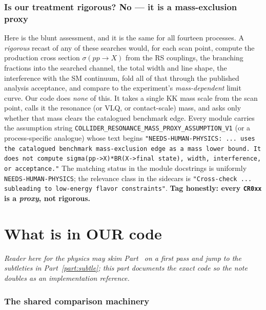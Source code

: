 \documentclass[11pt]{article}
\newcommand{\code}[1]{\texttt{#1}}
\theoremstyle{definition}
\begin{document}
\section{Is our treatment rigorous? No --- it is a mass-exclusion proxy}
\label{sec:proxy}

Here is the blunt assessment, and it is the same for all fourteen processes. A
\emph{rigorous} recast of any of these searches would, for each scan point,
compute the production cross section $\sigma(pp\to X)$ from the RS couplings, the
branching fractions into the searched channel, the total width and line shape,
the interference with the SM continuum, fold all of that through the published
analysis acceptance, and compare to the experiment's \emph{mass-dependent} limit
curve. Our code does \emph{none} of this. It takes a single KK mass scale from
the scan point, calls it the resonance (or VLQ, or contact-scale) mass, and asks
only whether that mass clears the catalogued benchmark edge. Every module carries
the assumption string \code{COLLIDER\_RESONANCE\_MASS\_PROXY\_ASSUMPTION\_V1}
(or a process-specific analogue) whose text begins
\code{"NEEDS-HUMAN-PHYSICS: ... uses the catalogued benchmark mass-exclusion edge
as a mass lower bound. It does not compute sigma(pp->X)*BR(X->final state),
width, interference, or acceptance."} The matching status in the module
docstrings is uniformly \code{NEEDS-HUMAN-PHYSICS}; the relevance class in the
sidecars is \code{"Cross-check ... subleading to low-energy flavor constraints"}.
\textbf{Tag honestly: every \code{CR0xx} is a \emph{proxy}, not rigorous.}

\part{What is in OUR code}
\label{part:code}

\emph{Reader here for the physics may skim Part~\ref{part:code} on a first pass
and jump to the subtleties in Part~\ref{part:subtle}; this part documents the
exact code so the note doubles as an implementation reference.}

\section{The shared comparison machinery}
\label{sec:codeproxy}
\end{document}
